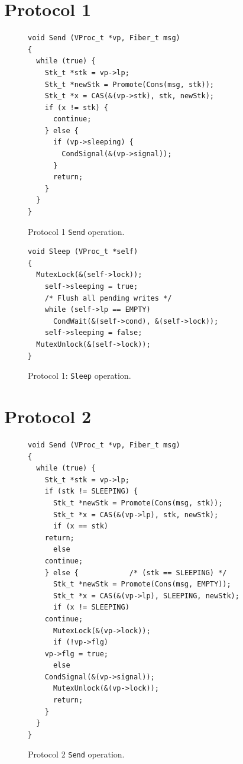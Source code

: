 \documentclass[11pt]{article}
\begin{document}
\section{Protocol 1}\label{sec:protocol1}

\begin{figure}
\lstset{language=C}
\lstset{commentstyle=\textit}
\lstset{numbers=left}
\begin{lstlisting}
void Send (VProc_t *vp, Fiber_t msg)
{
  while (true) {
    Stk_t *stk = vp->lp;
    Stk_t *newStk = Promote(Cons(msg, stk));
    Stk_t *x = CAS(&(vp->stk), stk, newStk);
    if (x != stk) {
      continue;
    } else {
      if (vp->sleeping) {
        CondSignal(&(vp->signal));
      }
      return;
    }
  }
}
\end{lstlisting}
\caption{Protocol 1 \texttt{Send} operation.}
\end{figure}

\begin{figure}
\lstset{language=C}
\lstset{commentstyle=\textit}
\lstset{numbers=left}
\begin{lstlisting}
void Sleep (VProc_t *self)
{
  MutexLock(&(self->lock));
    self->sleeping = true;
    /* Flush all pending writes */
    while (self->lp == EMPTY)
      CondWait(&(self->cond), &(self->lock));
    self->sleeping = false;
  MutexUnlock(&(self->lock));
}
\end{lstlisting}
\caption{Protocol 1: \texttt{Sleep} operation.}
\end{figure}

\section{Protocol 2}\label{sec:protocol2}

\begin{figure}
\lstset{language=C}
\lstset{commentstyle=\textit}
\lstset{numbers=left}
\begin{lstlisting}
void Send (VProc_t *vp, Fiber_t msg)
{
  while (true) {
    Stk_t *stk = vp->lp;
    if (stk != SLEEPING) {
      Stk_t *newStk = Promote(Cons(msg, stk));
      Stk_t *x = CAS(&(vp->lp), stk, newStk);
      if (x == stk)
	return;
      else
	continue;
    } else {            /* (stk == SLEEPING) */
      Stk_t *newStk = Promote(Cons(msg, EMPTY));
      Stk_t *x = CAS(&(vp->lp), SLEEPING, newStk);
      if (x != SLEEPING)
	continue;
      MutexLock(&(vp->lock));
      if (!vp->flg)
	vp->flg = true;
      else
	CondSignal(&(vp->signal));
      MutexUnlock(&(vp->lock));
      return;
    }
  }
}
\end{lstlisting}
\caption{Protocol 2 \texttt{Send} operation.}
\end{figure}
\end{document}
